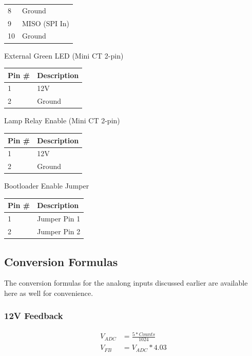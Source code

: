 \documentclass{article}
\begin{document}
\begin{description}[itemsep = 18pt]
\begin{center}
\begin{tabular}{l|l}
            8  & Ground \\
            9  & MISO (SPI In) \\
            10 & Ground \\
        \end{tabular}
    \end{center}
  \item[CON9:] External Green LED (Mini CT 2-pin)
    \begin{center}
        \begin{tabular}{l|l}
            Pin \# & Description \\
            \hline
            1 & 12V \\
            2 & Ground \\
        \end{tabular}
    \end{center}
  \item[CON10:] Lamp Relay Enable (Mini CT 2-pin)
    \begin{center}
        \begin{tabular}{l|l}
            Pin \# & Description \\
            \hline
            1 & 12V \\
            2 & Ground \\
        \end{tabular}
    \end{center}
  \item[JP1:] Bootloader Enable Jumper
    \begin{center}
        \begin{tabular}{l|l}
            Pin \# & Description \\
            \hline
            1 & Jumper Pin 1 \\
            2 & Jumper Pin 2 \\
        \end{tabular}
    \end{center}
\end{description}

\subsection{Conversion Formulas} \label{ssec:ConversionFormulas}
The conversion formulas for the analong inputs discussed earlier are available here as well for
convenience.

\subsubsection{12V Feedback}
\begin{align*}
    V_{ADC} &= \frac{5 * Counts}{1024}\\
    V_{FB}  &= V_{ADC} * 4.03
\end{align*}
\end{document}
